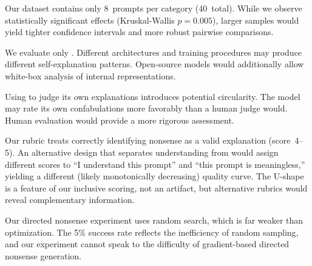  Our dataset contains only 8~prompts per category (40~total). While we observe statistically significant effects (Kruskal-Wallis $p = 0.005$), larger samples would yield tighter confidence intervals and more robust pairwise comparisons.

 We evaluate only \gptfour. Different architectures and training procedures may produce different self-explanation patterns. Open-source models would additionally allow white-box analysis of internal representations.

 Using \gptfour to judge its own explanations introduces potential circularity. The model may rate its own confabulations more favorably than a human judge would. Human evaluation would provide a more rigorous assessment.

 Our rubric treats correctly identifying nonsense as a valid explanation (score~4--5). An alternative design that separates understanding from \metarecog would assign different scores to ``I understand this prompt'' and ``this prompt is meaningless,'' yielding a different (likely monotonically decreasing) quality curve. The U-shape is a feature of our inclusive scoring, not an artifact, but alternative rubrics would reveal complementary information.

 Our directed nonsense experiment uses random search, which is far weaker than \gcg optimization. The 5\% success rate reflects the inefficiency of random sampling, and our experiment cannot speak to the difficulty of gradient-based directed nonsense generation.
